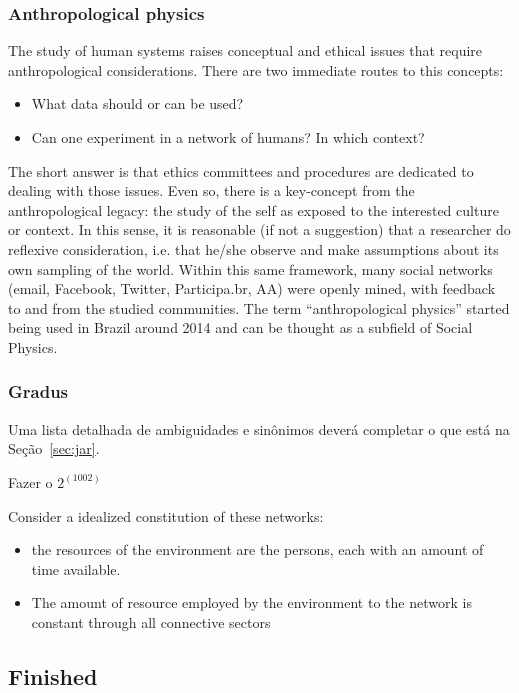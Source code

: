 \documentclass[a4paper,openright,12pt]{report} %
\begin{document}
\subsubsection{Anthropological physics}
The study of human systems raises conceptual
and ethical issues that require anthropological considerations.
There are two immediate routes to this concepts:
\begin{itemize}
	\item What data should or can be used?
	\item Can one experiment in a network of humans? In which context?
\end{itemize}

The short answer is that ethics committees and procedures are dedicated to dealing with those issues.
Even so, there is a key-concept from the anthropological legacy: the study of the self as exposed to the interested culture or context. 
In this sense, it is reasonable (if not a suggestion) that
a researcher do reflexive consideration, 
i.e. that he/she observe and make assumptions about its own sampling of the world.
Within this same framework, many social networks (email, Facebook, Twitter, Participa.br, AA) were openly mined,
with feedback to and from the studied communities.
The term ``anthropological physics'' started being used in Brazil around
2014 and can be thought as a subfield of Social Physics.

\subsubsection{Gradus}\label{sec:gradus}
Uma lista detalhada de ambiguidades e sinônimos deverá completar o que está na Seção~\ref{sec:jar}.

Fazer o $2^(100 2)$

Consider a idealized constitution of these networks: 
\begin{itemize}
	\item the resources of the environment are the persons, each with an amount of time available.
	\item The amount of resource employed by the environment to the network is constant through all connective sectors
\end{itemize}

\subsection{Finished}
\end{document}
